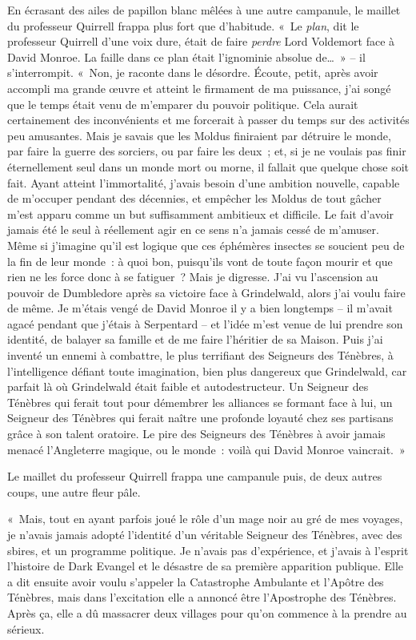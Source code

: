 En écrasant des ailes de papillon blanc mêlées à une autre campanule, le maillet du professeur Quirrell frappa plus fort que d'habitude.
«~Le \emph{plan}, dit le professeur Quirrell d'une voix dure, était de faire \emph{perdre} Lord Voldemort face à David Monroe.
La faille dans ce plan était l'ignominie absolue de…~»
-- il s'interrompit.
«~Non, je raconte dans le désordre.
Écoute, petit, après avoir accompli ma grande œuvre et atteint le firmament de ma puissance, j'ai songé que le temps était venu de m'emparer du pouvoir politique.
Cela aurait certainement des inconvénients et me forcerait à passer du temps sur des activités peu amusantes.
Mais je savais que les Moldus finiraient par détruire le monde, par faire la guerre des sorciers, ou par faire les deux~; et, si je ne voulais pas finir éternellement seul dans un monde mort ou morne, il fallait que quelque chose soit fait.
Ayant atteint l'immortalité, j'avais besoin d'une ambition nouvelle, capable de m'occuper pendant des décennies, et empêcher les Moldus de tout gâcher m'est apparu comme un but suffisamment ambitieux et difficile.
Le fait d'avoir jamais été le seul à réellement agir en ce sens n'a jamais cessé de m'amuser.
Même si j'imagine qu'il est logique que ces éphémères insectes se soucient peu de la fin de leur monde~: à quoi bon, puisqu'ils vont de toute façon mourir et que rien ne les force donc à se fatiguer~?
Mais je digresse.
J'ai vu l'ascension au pouvoir de Dumbledore après sa victoire face à Grindelwald, alors j'ai voulu faire de même.
Je m'étais vengé de David Monroe il y a bien longtemps -- il m'avait agacé pendant que j'étais à Serpentard -- et l'idée m'est venue de lui prendre son identité, de balayer sa famille et de me faire l'héritier de sa Maison.
Puis j'ai inventé un ennemi à combattre, le plus terrifiant des Seigneurs des Ténèbres, à l'intelligence défiant toute imagination, bien plus dangereux que Grindelwald, car parfait là où Grindelwald était faible et autodestructeur.
Un Seigneur des Ténèbres qui ferait tout pour démembrer les alliances se formant face à lui, un Seigneur des Ténèbres qui ferait naître une profonde loyauté chez ses partisans grâce à son talent oratoire.
Le pire des Seigneurs des Ténèbres à avoir jamais menacé l'Angleterre magique, ou le monde~: voilà qui David Monroe vaincrait.~»

Le maillet du professeur Quirrell frappa une campanule puis, de deux autres coups, une autre fleur pâle.

«~Mais, tout en ayant parfois joué le rôle d'un mage noir au gré de mes voyages, je n'avais jamais adopté l'identité d'un véritable Seigneur des Ténèbres, avec des sbires, et un programme politique.
Je n'avais pas d'expérience, et j'avais à l'esprit l'histoire de Dark Evangel et le désastre de sa première apparition publique.
Elle a dit ensuite avoir voulu s'appeler la Catastrophe Ambulante et l'Apôtre des Ténèbres, mais dans l'excitation elle a annoncé être l'Apostrophe des Ténèbres.
Après ça, elle a dû massacrer deux villages pour qu'on commence à la prendre au sérieux.

